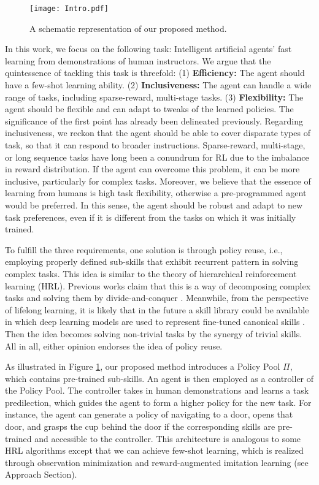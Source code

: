 \documentclass[conference]{IEEEtran}
\begin{document}
\begin{figure}[h]
    \centering
     \texttt{[image: Intro.pdf]}
    \caption{A schematic representation of our proposed method.}
    \label{fig:intro}
\end{figure}

In this work, we focus on the following task: Intelligent artificial agents' fast learning from demonstrations of human instructors. We argue that the quintessence of tackling this task is threefold: (1)  \textbf{Efficiency:} The agent should have a few-shot learning ability. (2) \textbf{Inclusiveness:} The agent can handle a wide range of tasks, including sparse-reward, multi-stage tasks. (3)  \textbf{Flexibility:} The agent should be flexible and can adapt to tweaks of the learned policies. The significance of the first point has already been delineated previously. Regarding inclusiveness, we reckon that the agent should be able to cover disparate types of task, so that it can respond to broader instructions. Sparse-reward, multi-stage, or long sequence tasks have long been a conundrum for RL due to the imbalance in reward distribution. If the agent can overcome this problem, it can be more inclusive, particularly for complex tasks. Moreover, we believe that the essence of learning from humans is high task flexibility, otherwise a pre-programmed agent would be preferred. In this sense, the agent should be robust and adapt to new task preferences, even if it is different from the tasks on which it was initially trained.

To fulfill the three requirements, one solution is through policy reuse, i.e., employing properly defined sub-skills that exhibit recurrent pattern in solving complex tasks. This idea is similar to the theory of hierarchical reinforcement learning (HRL). Previous works claim that this is a way of decomposing complex tasks and solving them by divide-and-conquer \cite{barreto2020fast,tessler2017deep}. Meanwhile, from the perspective of lifelong learning, it is likely that in the future a skill library could be available in which deep learning models are used to represent fine-tuned canonical skills \cite{chen2018lifelong}. Then the idea becomes solving non-trivial tasks by the synergy of trivial skills. All in all, either opinion endorses the idea of policy reuse. 

As illustrated in Figure \ref{fig:intro}, our proposed method introduces a Policy Pool $\Pi$, which contains pre-trained sub-skills. An agent is then employed as a controller of the Policy Pool. The controller takes in human demonstrations and learns a task predilection, which guides the agent to form a higher policy for the new task. For instance, the agent can generate a policy of navigating to a door, opens that door, and grasps the cup behind the door if the corresponding skills are pre-trained and accessible to the controller. This architecture is analogous to some HRL algorithms except that we can achieve few-shot learning, which is realized through observation minimization and reward-augmented imitation learning (see Approach Section). 
\end{document}

